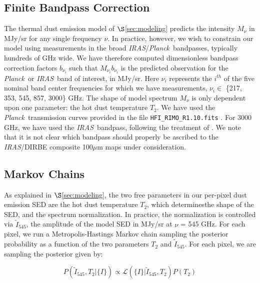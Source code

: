 \documentclass{emulateapj}
\newcommand{\IRAS}{{\it IRAS}}
\newcommand{\PLANCK}{{\it Planck}}
\begin{document}

\subsection{Finite Bandpass Correction}
The thermal dust emission model of $\S$\ref{sec:modeling} predicts the 
intensity $M_{\nu}$ in MJy/sr for any single frequency $\nu$. In practice, 
however, we wish to constrain our model using measurements in the broad 
\IRAS/\PLANCK~bandpasses, typically hundreds of GHz wide. We have therefore 
computed dimensionless bandpass correction factors $b_{\nu_i}$ such that 
$M_{\nu_i}b_{\nu_i}$ is the predicted observation for the \PLANCK~or \IRAS~band
 of interest, in MJy/sr. Here $\nu_i$ represents the $i^{th}$ of the five 
nominal band center frequencies for which we have measurements, $\nu_i \in$
\{217, 353, 545, 857, 3000\} GHz. The shape of model spectrum $M_{\nu}$ is only
dependent upon one parameter: the hot dust temperature $T_2$. We have used the 
\PLANCK~transmission curves provided in the file 
\verb|HFI_RIMO_R1.10.fits| \citep{planckresponse}. For 3000 GHz, we have 
used the \IRAS~bandpass, following the treatment of \cite{planckdust}. We note 
that it is not clear which bandpass should properly be ascribed to the 
\IRAS/DIRBE composite 100$\mu$m maps under consideration. 



\subsection{Markov Chains}
As explained in $\S$\ref{sec:modeling}, the two free parameters in our 
per-pixel dust emission SED are the hot dust temperature $T_2$, which 
determinesthe shape of the SED, and the spectrum normalization. In practice,
the normalization is controlled via $\tilde{I}_{545}$, the amplitude of the 
model SED in MJy/sr at $\nu$ = 545 GHz. For each pixel, we run a 
Metropolis-Hastings Markov chain sampling the posterior probability as a 
function of the two parameters $T_2$ and $\tilde{I}_{545}$. For each pixel, we 
are sampling the posterior given by:

\begin{equation}
P(\tilde{I}_{545}, T_2|\{I\}) \propto \mathcal{L}(\{I\}|\tilde{I}_{545}, T_2)P(T_2)
\end{equation}
\end{document}
